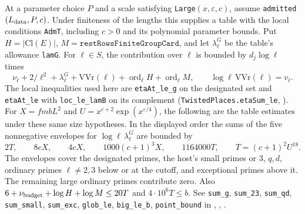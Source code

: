 \begin{formalstatement}
At a parameter choice $P$ and a scale satisfying
\nolinkurl{Large}$(x,\varepsilon,c)$, assume \nolinkurl{admitted}$(L_{\rm data},P,c)$.
Under finiteness of the lengths this supplies a table with the local
conditions \nolinkurl{AdmT}, including $c>0$ and its polynomial parameter
bounds. Put $H=|\mathrm{Cl}(E)|$, $M=\texttt{restRowsFiniteGroupCard}$,
and let $\lambda_\ell^{G}$ be the table's allowance \nolinkurl{lamG}.
For $\ell\in S$, the contribution over $\ell$ is bounded by $d_j\log\ell$ times
\[
 \nu_\ell+2/\ell^2+\lambda_\ell^{G}+\mathrm{VVr}(\ell)
       +\operatorname{ord}_\ell H+\operatorname{ord}_\ell M,
 \qquad \log\ell\,\mathrm{VVr}(\ell)=v_\ell .
\]
The local inequalities used here are \nolinkurl{etaAt_le_g} on the designated
set and \nolinkurl{etaAt_le} with \nolinkurl{loc_le_lamB} on its complement
(\nolinkurl{TwistedPlaces.etaSum_le}, ).
For $X=fmbL^2$ and $U=x^{c+2}\exp(x^{\varepsilon/4})$, the following
are the table estimates under these same size hypotheses. In the displayed
order the sums of the five nonnegative envelopes for
$\log\ell\,\lambda_\ell^G$ are bounded by
\[
 2T,\qquad 8cX,\qquad 4cX,\qquad 1000(c+1)^3X,\qquad 1164000T,
 \qquad T=(c+1)^2U^{18}.
\]
The envelopes cover the designated primes, the host's small primes or $3$,
$q,d$, ordinary primes $\ell\ne2,3$ below or at the cutoff, and exceptional
primes above it. The remaining large ordinary primes contribute zero.
Also $6+\nu_{\rm budget}+\log H+\log M\le20T$ and $4\cdot10^6T\le b$.
See \nolinkurl{sum_g}, \nolinkurl{sum_23}, \nolinkurl{sum_qd},
\nolinkurl{sum_small}, \nolinkurl{sum_exc}, \nolinkurl{glob_le}, \nolinkurl{big_le_b},
\nolinkurl{point_bound} in ,
,
.
\end{formalstatement}

